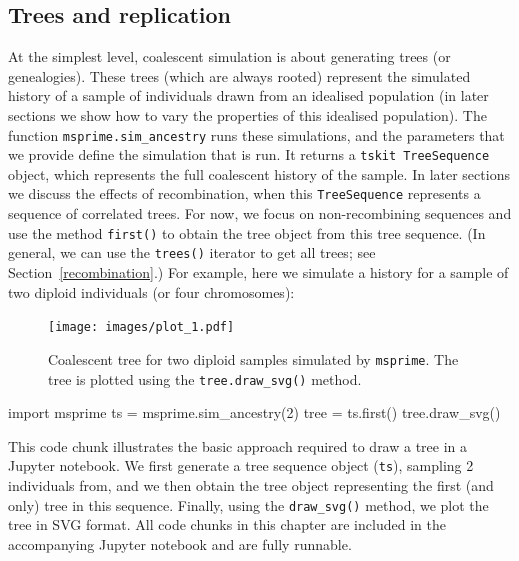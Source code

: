 \documentclass[graybox]{svmult}
\newcommand{\msprime}[0]{\texttt{msprime}}
\newcommand{\tskit}[0]{\texttt{tskit}}
\begin{document}
\subsection{Trees and replication}
At the simplest level, coalescent simulation is about generating trees (or genealogies).
These trees (which are always rooted) represent the simulated history of a sample of individuals
drawn from an idealised population (in later sections we show how to
vary the properties of this idealised population). The function
\texttt{msprime.sim\_ancestry} runs these simulations, and the parameters
that we provide define the simulation that is
run. It returns a \tskit\ \texttt{TreeSequence} object, which represents the
full coalescent history of the sample. In later sections we discuss the
effects of recombination, when this \texttt{TreeSequence} represents a
sequence of correlated trees. For now, we focus on non-recombining sequences and
use the method \texttt{first()} to obtain the
tree object from this tree sequence. (In general, we can use the \texttt{trees()} iterator
to get all trees; see Section~\ref{recombination}.)
For example, here we simulate a
history for a sample of two diploid individuals (or four chromosomes):

\begin{figure}[t]
\begin{center}
\texttt{[image: images/plot\_1.pdf]}
\end{center}
\caption{\label{fig-simple-tree} Coalescent tree for two diploid samples
simulated by \msprime.
The tree is plotted using the \texttt{tree.draw\_svg()} method.}
\end{figure}

\begin{pythoncode}
import msprime
ts = msprime.sim_ancestry(2)
tree = ts.first()
tree.draw_svg()
\end{pythoncode}

This code chunk illustrates the basic approach required to draw a tree
in a Jupyter notebook. We first generate a tree sequence object (\texttt{ts}),
sampling 2 individuals from,
and we then obtain the tree object representing the first (and only)
tree in this sequence. Finally, using the \texttt{draw\_svg()} method, we plot
the tree in SVG format.
All code chunks in this chapter are included in the accompanying Jupyter
notebook and are fully runnable.
\end{document}
